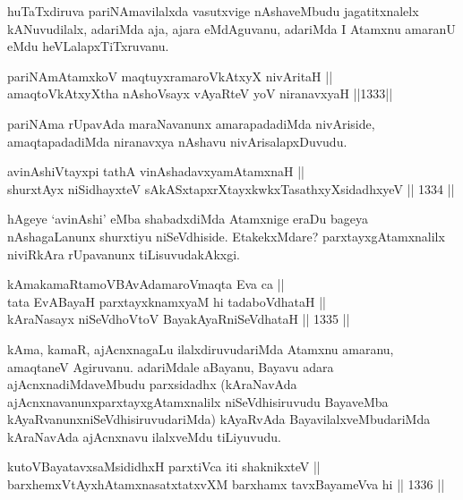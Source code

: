\begin{artha}
huTaTxdiruva pariNAmavilalxda vasutxvige nAshaveMbudu jagatitxnalelx kANuvudilalx, adariMda aja, ajara eMdAguvanu, adariMda I Atamxnu amaranU eMdu heVLalapxTiTxruvanu.
\end{artha}


\begin{shl}
pariNAmAtamxkoV maqtuyxramaroVkAtxyX nivAritaH || \\
amaqtoVkAtxyX\s tha nAshoV\s sayx vAyaRteV yoV niranavxyaH \hfill ||1333||  
\end{shl}

\begin{artha}
pariNAma rUpavAda maraNavanunx amarapadadiMda nivAriside, amaqtapadadiMda niranavxya nAshavu nivArisalapxDuvudu.
\end{artha}

\begin{shl}
avinAshiVtayxpi tathA vinAshadavxyamAtamxnaH || \\
shurxtAyx niSidhayxteV sAkASxtapxrXtayxkwkxTasathxyXsidadhxyeV \hfill || 1334 ||  
\end{shl}

\begin{artha}
hAgeye `avinAshi' eMba shabadxdiMda Atamxnige eraDu bageya nAshagaLanunx shurxtiyu niSeVdhiside. EtakekxMdare? parxtayxgAtamxnalilx niviRkAra rUpavanunx tiLisuvudakAkxgi.
\end{artha}

\begin{shl}
kAmakamaRtamoVBAvAdamaroV\s maqta Eva ca || \\
tata EvABayaH parxtayxknamxyaM hi tadaboVdhataH || \\
kAraNasayx niSeVdhoV\s toV BayakAyaRniSeVdhataH \hfill || 1335 ||  
\end{shl}

\begin{artha}
kAma, kamaR, ajAcnxnagaLu ilalxdiruvudariMda Atamxnu amaranu, amaqtaneV Agiruvanu. adariMdale aBayanu, Bayavu adara ajAcnxnadiMdaveMbudu parxsidadhx (kAraNavAda ajAcnxnavanunx\break parxtayxgAtamxnalilx niSeVdhisiruvudu BayaveMba kAyaRvanunx\break niSeVdhisiruvudariMda) kAyaRvAda BayavilalxveMbudariMda kAraNavAda ajAcnxnavu ilalxveMdu tiLiyuvudu.
\end{artha}

\begin{shl}
kutoV\s BayatavxsaMsididhxH parxtiVca iti shaknikxteV || \\
barxhemxVtAyxhA\s \s tamxnasatxtatxvXM barxhamx tavxBayameVva hi \hfill || 1336 ||  
\end{shl}


